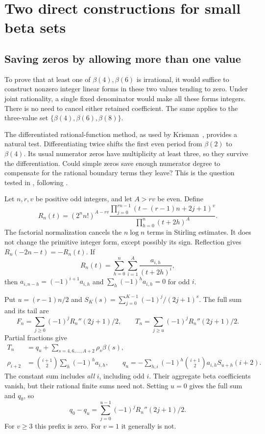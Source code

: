 \section{Two direct constructions for small beta sets}\label{sec:small}

\subsection{Saving zeros by allowing more than one value}

To prove that at least one of $\beta(4),\beta(6)$ is irrational, it
would suffice to construct nonzero integer linear forms in these two
values tending to zero. Under joint rationality, a single fixed
denominator would make all these forms integers. There is no need to
cancel either retained coefficient. The same applies to the three-value
set $\{\beta(4),\beta(6),\beta(8)\}$.

The differentiated rational-function method, as used by
Krisman~\cite[Sections~2--4, especially Lemma~4.6]{Krisman}, provides
a natural test. Differentiating twice shifts the first even period
from $\beta(2)$ to $\beta(4)$. Its usual numerator zeros have
multiplicity at least three, so they survive the differentiation.
Could simple zeros save enough numerator degree to compensate for
the rational boundary terms they leave? This is the question tested
in , following .

Let $n,r,v$ be positive odd integers, and let $A>rv$ be even. Define
\begin{equation}\label{eq:small-rational}
 R_n(t)=(2^nn!)^{A-rv}
 \frac{\displaystyle\prod_{j=0}^{rn-1}
               (t-(r-1)n+2j+1)^v}
      {\displaystyle\prod_{h=0}^n(t+2h)^A}.
\end{equation}
The factorial normalization cancels the $n\log n$ terms in Stirling
estimates. It does not change the primitive integer form, except
possibly its sign. Reflection gives $R_n(-2n-t)=-R_n(t)$. If
\[
 R_n(t)=\sum_{h=0}^n\sum_{i=1}^A\frac{a_{i,h}}{(t+2h)^i},
\]
then $a_{i,n-h}=(-1)^{i+1}a_{i,h}$ and
$\sum_h(-1)^ha_{i,h}=0$ for odd $i$.

Put $u=(r-1)n/2$ and $S_K(s)=\sum_{j=0}^{K-1}(-1)^j/(2j+1)^s$.
The full sum and its tail are
\[
 F_n=\sum_{j\ge0}(-1)^jR_n''(2j+1)/2,\qquad
 T_n=\sum_{j\ge u}(-1)^jR_n''(2j+1)/2.
\]
Partial fractions give
\begin{align}\label{eq:small-form}
 T_n&=q_u+\sum_{s=4,6,\ldots,A+2}\rho_s\beta(s),\nonumber\\
 \rho_{i+2}&=\binom{i+1}2\sum_h(-1)^ha_{i,h},\qquad
 q_u=-\sum_{h,i}(-1)^h\binom{i+1}2a_{i,h}S_{u+h}(i+2).
\end{align}
The constant sum includes \emph{all} $i$, including odd $i$. Their
aggregate beta coefficients vanish, but their rational finite sums
need not. Setting $u=0$ gives the full sum and $q_0$, so
\begin{equation}\label{eq:small-prefix}
 q_0-q_u=\sum_{j=0}^{u-1}(-1)^jR_n''(2j+1)/2.
\end{equation}
For $v\ge3$ this prefix is zero. For $v=1$ it generally is not.

